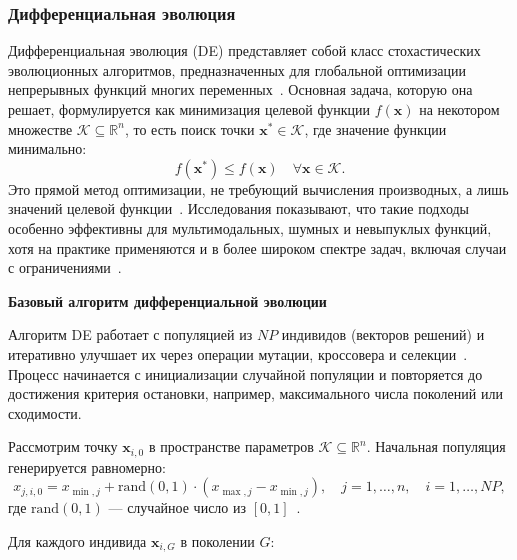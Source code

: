 \documentclass[a4paper]{article}
\begin{document}
\subsubsection{Дифференциальная эволюция}

Дифференциальная эволюция (DE) представляет собой класс стохастических эволюционных алгоритмов, предназначенных для глобальной оптимизации непрерывных функций многих переменных~\cite{1,4}. Основная задача, которую она решает, формулируется как минимизация целевой функции \( f(\mathbf{x}) \) на некотором множестве \( \mathcal{K} \subseteq \mathbb{R}^n \), то есть поиск точки \( \mathbf{x}^* \in \mathcal{K} \), где значение функции минимально:
\[
f(\mathbf{x}^*) \leq f(\mathbf{x}) \quad \forall \mathbf{x} \in \mathcal{K}.
\]
Это прямой метод оптимизации, не требующий вычисления производных, а лишь значений целевой функции~\cite{1}. Исследования показывают, что такие подходы особенно эффективны для мультимодальных, шумных и невыпуклых функций, хотя на практике применяются и в более широком спектре задач, включая случаи с ограничениями~\cite{4,6}.

\textbf{Базовый алгоритм дифференциальной эволюции}

Алгоритм DE работает с популяцией из \( NP \) индивидов (векторов решений) и итеративно улучшает их через операции мутации, кроссовера и селекции~\cite{1,4}. Процесс начинается с инициализации случайной популяции и повторяется до достижения критерия остановки, например, максимального числа поколений или сходимости.

Рассмотрим точку \( \mathbf{x}_{i,0} \) в пространстве параметров \( \mathcal{K} \subseteq \mathbb{R}^n \). Начальная популяция генерируется равномерно:
\[
x_{j,i,0} = x_{\min,j} + \text{rand}(0,1) \cdot (x_{\max,j} - x_{\min,j}), \quad j=1,\dots,n, \quad i=1,\dots,NP,
\]
где \( \text{rand}(0,1) \) — случайное число из \([0,1]\)~\cite{4,6}.

Для каждого индивида \( \mathbf{x}_{i,G} \) в поколении \( G \):
\end{document}
